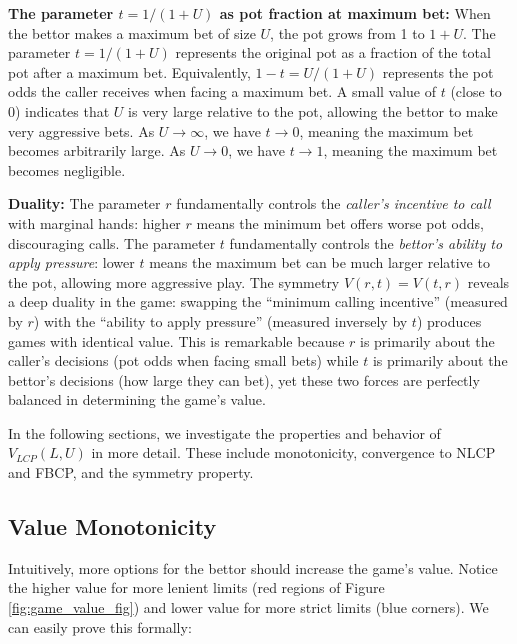 \documentclass[../../main/main.tex]{subfiles}
\begin{document}
\textbf{The parameter $t = 1/(1+U)$ as pot fraction at maximum bet:}
When the bettor makes a maximum bet of size $U$, the pot grows from 1 to $1+U$. The parameter $t = 1/(1+U)$ represents the original pot as a fraction of the total pot after a maximum bet. Equivalently, $1-t = U/(1+U)$ represents the pot odds the caller receives when facing a maximum bet. A small value of $t$ (close to 0) indicates that $U$ is very large relative to the pot, allowing the bettor to make very aggressive bets. As $U \to \infty$, we have $t \to 0$, meaning the maximum bet becomes arbitrarily large. As $U \to 0$, we have $t \to 1$, meaning the maximum bet becomes negligible.

\textbf{Duality:}
The parameter $r$ fundamentally controls the \emph{caller's incentive to call} with marginal hands: higher $r$ means the minimum bet offers worse pot odds, discouraging calls. The parameter $t$ fundamentally controls the \emph{bettor's ability to apply pressure}: lower $t$ means the maximum bet can be much larger relative to the pot, allowing more aggressive play. The symmetry $V(r,t) = V(t,r)$ reveals a deep duality in the game: swapping the ``minimum calling incentive'' (measured by $r$) with the ``ability to apply pressure'' (measured inversely by $t$) produces games with identical value. This is remarkable because $r$ is primarily about the caller's decisions (pot odds when facing small bets) while $t$ is primarily about the bettor's decisions (how large they can bet), yet these two forces are perfectly balanced in determining the game's value.

In the following sections, we investigate the properties and behavior of $V_{LCP}(L, U)$ in more detail. These include monotonicity, convergence to NLCP and FBCP, and the symmetry property.


\subsection{Value Monotonicity}

Intuitively, more options for the bettor should increase the game's value. Notice the higher value for more lenient limits (red regions of Figure \ref{fig:game_value_fig}) and lower value for more strict limits (blue corners). We can easily prove this formally:
\end{document}

